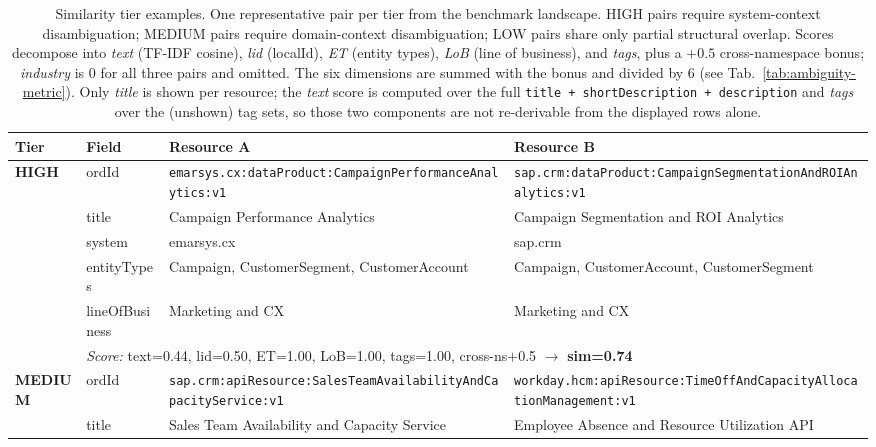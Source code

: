 \begin{table}[!t]
  \renewcommand{\arraystretch}{1.2}
  \caption{Similarity tier examples. One representative pair per tier from the benchmark landscape. HIGH pairs require system-context disambiguation; MEDIUM pairs require domain-context disambiguation; LOW pairs share only partial structural overlap. Scores decompose into \emph{text} (TF-IDF cosine), \emph{lid} (localId), \emph{ET} (entity types), \emph{LoB} (line of business), and \emph{tags}, plus a $+0.5$ cross-namespace bonus; \emph{industry} is 0 for all three pairs and omitted. The six dimensions are summed with the bonus and divided by 6 (see Tab.~\ref{tab:ambiguity-metric}). Only \emph{title} is shown per resource; the \emph{text} score is computed over the full \texttt{title + shortDescription + description} and \emph{tags} over the (unshown) tag sets, so those two components are not re-derivable from the displayed rows alone.}
  \label{tab:tier-examples-full}
  \centering\footnotesize
  \setlength{\tabcolsep}{4pt}
  \begin{tabularx}{\textwidth}{@{} l l X X @{}}
  \toprule
  \textbf{Tier} & \textbf{Field} & \textbf{Resource A} & \textbf{Resource B} \\
  \midrule
  \multirow{6}{*}{\textbf{HIGH}}
  & ordId          & \texttt{emarsys.cx:\allowbreak dataProduct:\allowbreak CampaignPerformanceAnalytics:\allowbreak v1} & \texttt{sap.crm:\allowbreak dataProduct:\allowbreak CampaignSegmentationAndROIAnalytics:\allowbreak v1} \\
  & title          & Campaign Performance Analytics & Campaign Segmentation and ROI Analytics \\
  & system         & emarsys.cx & sap.crm \\
  & entityTypes    & Campaign, CustomerSegment, CustomerAccount & Campaign, CustomerAccount, CustomerSegment \\
  & lineOfBusiness & Marketing and CX & Marketing and CX \\
  & \multicolumn{3}{l}{\emph{Score:} text=0.44, lid=0.50, ET=1.00, LoB=1.00, tags=1.00, cross-ns$+$0.5 $\rightarrow$ \textbf{sim=0.74}} \\
  \midrule
  \multirow{6}{*}{\textbf{MEDIUM}}
  & ordId          & \texttt{sap.crm:\allowbreak apiResource:\allowbreak SalesTeamAvailabilityAndCapacityService:\allowbreak v1} & \texttt{workday.hcm:\allowbreak apiResource:\allowbreak TimeOffAndCapacityAllocationManagement:\allowbreak v1} \\
  & title          & Sales Team Availability and Capacity Service & Employee Absence and Resource Utilization API \\

\end{tabularx}
\end{table}
